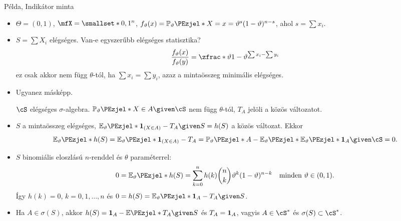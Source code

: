\documentclass[aspectratio=169,notheorems,9pt,\option]{beamer}
\begin{document}
\begin{frame}{Példa, Indikátor minta}
  \begin{itemize}
    \item $\Theta=(0,1)$, $\mfX=\smallset*{0,1}^n$, 
      $f_\theta(x)=\P[\theta]{X=x}=\theta^{s}(1-\theta)^{n-s}$, ahol $s=\sum x_i$.
    \item $S=\sum X_i$ elégséges. Van-e egyszerűbb elégséges statisztika?
    \continue
    \begin{displaymath}
      \frac{f_\theta(x)}{f_\theta(y)}=\zfrac*{\theta}{1-\theta}^{\sum x_i-\sum y_i}  
    \end{displaymath}
    ez csak akkor nem függ $\theta$-tól, ha $\sum x_i=\sum y_i$, azaz a mintaösszeg minimális elégséges.
    \pause
    \item Ugyanez másképp. 
    
    $\cS$ elégséges $\sigma$-algebra. $\P[\theta]{X\in A\given \cS}$ nem függ $\theta$-tól, 
    $T_A$ jelöli a közös változatot.
    \item $S$ a mintaösszeg elégséges, $\E[\theta]{\I{X\in A}-T_A\given S}=h(S)$ a közös változat. Ekkor 
    \begin{displaymath}
      \E[\theta]{h(S)}=\E[\theta]{\I{X\in A}-T_A}
      =\P[\theta]{A}-\E[\theta]{\E[\theta]{\I[A]\given \cS}}=0.
    \end{displaymath}
    \item $S$ binomiális eloszlású $n$-renddel 
    és $\theta$ paraméterrel:
    \begin{displaymath}
      0=\E[\theta]{h(S)}=
      \sum_{k=0}^n h(k)\binom n k \theta^k(1-\theta)^{n-k}\quad\text{minden $\theta\in(0,1)$}.
    \end{displaymath}
    Így $h(k)=0$, $k=0,1,\dots,n$ és $0=h(S)=\E[\theta]{\I[A]-T_A\given S}$.
    \item Ha $A\in\sigma(S)$, akkor $h(S)=\I[A]-\E{T_A\given S}$ és $T_A=\I[A]$, vagyis $A\in\cS^*$ és $\sigma(S)\subset\cS^*$.
  \end{itemize}
\end{frame}
\end{document}
